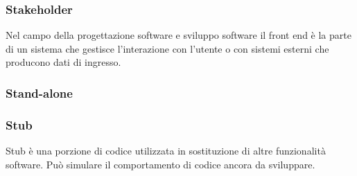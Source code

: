 \subsubsection*{Stakeholder}
Nel campo della progettazione software e sviluppo software il front end è la parte di un sistema che gestisce l’interazione con l’utente o con sistemi esterni che producono dati di ingresso.
\subsubsection*{Stand-alone}

\subsubsection*{Stub}
Stub è una porzione di codice utilizzata in sostituzione di altre funzionalità software. Può simulare il comportamento di codice ancora da sviluppare.
